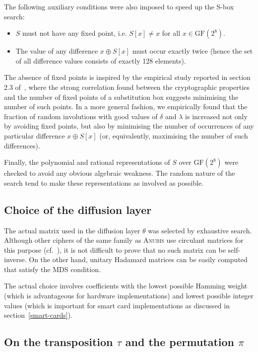 \documentclass{llncs}
\newcommand{\GF}{\mathrm{GF}}
\begin{document}
The following auxiliary conditions were also imposed to speed up
the S-box search:
\begin{itemize}
\item $S$ must not have any fixed point, i.e. $S[x] \neq x$
for all $x \in \GF(2^8)$.
\item The value of any difference $x \oplus S[x]$ must occur exactly
twice (hence the set of all difference values consists of exactly
128 elements).
\end{itemize}

The absence of fixed points is inspired by the empirical study
reported in section 2.3 of~\cite{youssef-tavares-heys}, where the
strong correlation found between the cryptographic properties and
the number of fixed points of a substitution box suggests
minimising the number of such points. In a more general fashion,
we empirically found that the fraction of random involutions with
good values of $\delta$ and $\lambda$ is increased not only by
avoiding fixed points, but also by minimising the number of
occurrences of any particular difference $x \oplus S[x]$ (or,
equivalently, maximising the number of such differences).

Finally, the polynomial and rational representations of $S$ over
$\GF(2^8)$ were checked to avoid any obvious algebraic weakness.
The random nature of the search tend to make these
representations as involved as possible.

\subsection{Choice of the diffusion layer}

The actual matrix used in the diffusion layer $\theta$ was
selected by exhaustive search. Although other ciphers of the same
family as \textsc{Anubis} use circulant matrices for this purpose
(cf.~\cite{square,rijndael}), it is not difficult to prove that no
such matrix can be self-inverse. On the other hand, unitary
Hadamard matrices can be easily computed that satisfy the MDS
condition.

The actual choice involves coefficients with the lowest possible
Hamming weight (which is advantageous for hardware
implementations) and lowest possible integer values (which is
important for smart card implementations as discussed in
section~\ref{smart-cards}).

\subsection{On the transposition $\tau$ and the permutation $\pi$}
\end{document}
